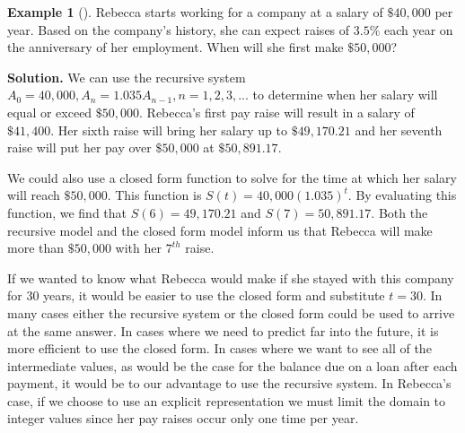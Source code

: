 \documentclass[10pt,]{book}
\theoremstyle{plain}
\theoremstyle{definition}
\theoremstyle{definition}
\newtheorem{example}[theorem]{Example}
\theoremstyle{definition}
\numberwithin{equation}{section}
\begin{document}
\begin{example}[]\label{example-recursive-salary}
\hypertarget{p-111}{}%
Rebecca starts working for a company at a salary of \(\$40,000\) per year. Based on the company's history, she can expect raises of \(3.5\%\) each year on the anniversary of her employment. When will she first make \(\$50,000\)?%
\par\smallskip%
\noindent\textbf{Solution.}\hypertarget{solution-9}{}\quad%
\hypertarget{p-112}{}%
We can use the recursive system \(A_0=40,000, A_n=1.035A_{n-1}, n=1,2,3,...\) to determine when her salary will equal or exceed \(\$50,000\).  Rebecca’s first pay raise will result in a salary of \(\$41,400\).  Her sixth raise will bring her salary up to \(\$49,170.21\) and her seventh raise will put her pay over \(\$50,000\) at \(\$50,891.17\).%
\par
\hypertarget{p-113}{}%
We could also use a closed form function to solve for the time at which her salary will reach \(\$50,000\).  This function is \(S(t)=40,000(1.035)^t\). By evaluating this function, we find that \(S(6)=49,170.21\) and \(S(7)=50,891.17\). Both the recursive model and the closed form model inform us that Rebecca will make more than \(\$50,000\) with her \(7^{th}\) raise.%
\par
\hypertarget{p-114}{}%
If we wanted to know what Rebecca would make if she stayed with this company for \(30\) years, it would be easier to use the closed form and substitute \(t=30\).  In many cases either the recursive system or the closed form could be used to arrive at the same answer. In cases where we need to predict far into the future, it is more efficient to use the closed form. In cases where we want to see all of the intermediate values, as would be the case for the balance due on a loan after each payment, it would be to our advantage to use the recursive system. In Rebecca's case, if we choose to use an explicit representation we must limit the domain to integer values since her pay raises occur only one time per year.%
\end{example}
\end{document}
